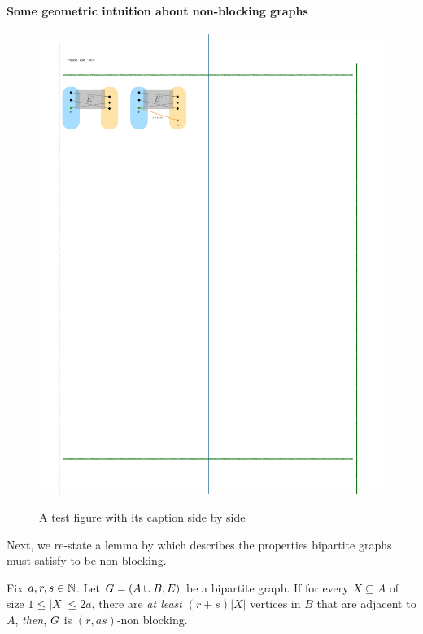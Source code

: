 \documentclass[11pt]{article}
\begin{document}
\paragraph{Some geometric intuition about non-blocking graphs} \par
\begin{figure}[h]
\center
{\caption{A test figure with its caption side by side}\label{fig:test}}
{\includegraphics{assets/non-blocking-networks.pdf}}
\end{figure}

Next, we re-state a lemma by \citep[Proposition 1]{feldman1988wide} which describes the properties bipartite graphs must satisfy to be non-blocking.

\begin{lemma}
Fix $a, r, s \in \mathbb{N}$. Let $G = (A \cup B, E)$ be a bipartite graph.
If for every $X \subseteq A$ of size $1 \leq |X| \leq 2a$, there are \emph{at least} $(r + s)|X|$ vertices in $B$ that are adjacent to $A$, \emph{then}, $G$ is $(r, as)$-non blocking.
\end{lemma}
\end{document}

